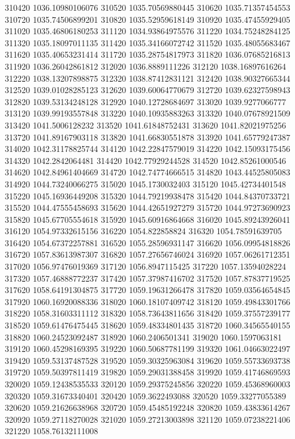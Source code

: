 {310420 1036.10980106076
310520 1035.70569880445
310620 1035.71357454553
310720 1035.74506899201
310820 1035.52959618149
310920 1035.47455929405
311020 1035.46806180253
311120 1034.93864975576
311220 1034.75248284125
311320 1035.18097011135
311420 1035.34166072742
311520 1035.48055683467
311620 1035.40653231414
311720 1035.28754817973
311820 1036.07685216813
311920 1036.26042861812
312020 1036.8889111226
312120 1038.16897616264
312220 1038.13207898875
312320 1038.87412831121
312420 1038.90327665344
312520 1039.01028285123
312620 1039.60064770679
312720 1039.62327598943
312820 1039.53134248128
312920 1040.12728684697
313020 1039.9277066777
313120 1039.99193557848
313220 1040.10935883263
313320 1040.07678921509
313420 1041.5006128232
313520 1041.61848752431
313620 1041.82021975256
313720 1041.89167903118
313820 1041.66830551878
313920 1041.65779247387
314020 1042.31178825744
314120 1042.22847579019
314220 1042.15093175456
314320 1042.2842064481
314420 1042.77929244528
314520 1042.85261000546
314620 1042.84961404669
314720 1042.74774666515
314820 1043.44525805083
314920 1044.73240066275
315020 1045.1730032403
315120 1045.42734401548
315220 1045.16936449208
315320 1044.79219938478
315420 1044.84370733721
315520 1044.47555458693
315620 1044.42651927279
315720 1044.97273690923
315820 1045.67705554618
315920 1045.60916864668
316020 1045.89243926041
316120 1054.97332615156
316220 1054.822858824
316320 1054.78591639705
316420 1054.67372257881
316520 1055.28596931147
316620 1056.09954818826
316720 1057.83613987307
316820 1057.27656746024
316920 1057.06261712351
317020 1056.97476019369
317120 1056.8947115425
317220 1057.13594028224
317320 1057.46888772237
317420 1057.37987416702
317520 1057.87837719525
317620 1058.64191304875
317720 1059.19631266478
317820 1059.03564654845
317920 1060.16920088336
318020 1060.18107409742
318120 1059.49843301766
318220 1058.31603311112
318320 1058.73643811656
318420 1059.37557239177
318520 1059.61476475445
318620 1059.48334801435
318720 1060.34565540155
318820 1060.24523092487
318920 1060.2406501341
319020 1060.1597063181
319120 1060.45298169395
319220 1060.50687781199
319320 1061.04663022497
319420 1059.53137487528
319520 1059.30325963084
319620 1059.55733693738
319720 1059.50397811419
319820 1059.29031388458
319920 1059.41746869593
320020 1059.12438535533
320120 1059.29375245856
320220 1059.45368960003
320320 1059.31673340401
320420 1059.3622493088
320520 1059.33277055389
320620 1059.21626638968
320720 1059.45485192248
320820 1059.43833614267
320920 1059.27118270028
321020 1059.27213003898
321120 1059.07238221406
321220 1058.76132111008
}
